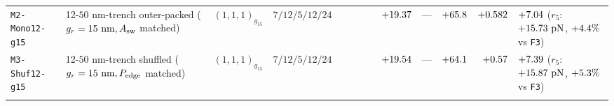 \begin{table}[!htbp]
{\begin{tabular}{llccrrrrrrrrl}
\texttt{M2-Mono12-g15} & 12-$50\text{ nm}$-trench outer-packed ($g_r=15\text{ nm}, A_{\rm sw}$ matched) & $(1,1,1)_{g_{15}}$ & $7 / 12 / 5 / 12 / 24$ & \roundfour{\NthreeOptMtwoMonoonetwoGonefiveAreaUmtwo} & \roundtwo{\NthreeOptMtwoMonoonetwoGonefivePedgeUm} & \roundtwo{\NthreeOptMtwoMonoonetwoGonefiveAswUmtwo} & \roundone{\NthreeOptMtwoMonoonetwoGonefiveGrHarmNm} & $+\roundtwo{\NthreeOptMtwoMonoonetwoGonefiveFzPn}$ & --- & $+\roundone{\NthreeOptMtwoMonoonetwoGonefiveFa}$ & $+\roundthree{\NthreeOptMtwoMonoonetwoGonefiveFp}$ & $+\roundtwo{\NthreeOptMtwoMonoonetwoGonefiveFasw}$ ($r_5$: $+\roundtwo{\NthreeOptMtwoMonoonetwoGonefiveRfivenmFzPn}\text{ pN}$, $+\roundone{\NthreeOptDiffMtwoMonoonetwoGonefiveVsFoneoneonePct}\%$ vs \texttt{F3}) \\
\texttt{M3-Shuf12-g15} & 12-$50\text{ nm}$-trench shuffled ($g_r=15\text{ nm}, P_{\rm edge}$ matched) & $(1,1,1)_{g_{15}}$ & $7 / 12 / 5 / 12 / 24$ & \roundfour{\NthreeOptMthreeShufonetwoGonefiveAreaUmtwo} & \roundtwo{\NthreeOptMthreeShufonetwoGonefivePedgeUm} & \roundtwo{\NthreeOptMthreeShufonetwoGonefiveAswUmtwo} & \roundone{\NthreeOptMthreeShufonetwoGonefiveGrHarmNm} & $+\roundtwo{\NthreeOptMthreeShufonetwoGonefiveFzPn}$ & --- & $+\roundone{\NthreeOptMthreeShufonetwoGonefiveFa}$ & $+\roundthree{\NthreeOptMthreeShufonetwoGonefiveFp}$ & $+\roundtwo{\NthreeOptMthreeShufonetwoGonefiveFasw}$ ($r_5$: $+\roundtwo{\NthreeOptMthreeShufonetwoGonefiveRfivenmFzPn}\text{ pN}$, $+\roundone{\NthreeOptDiffMthreeShufonetwoGonefiveVsFoneoneonePct}\%$ vs \texttt{F3}) \\
\botrule
\end{tabular}%
}
\smallskip


\end{table}
